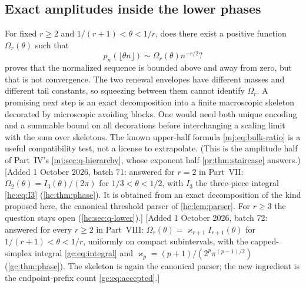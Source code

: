 \documentclass[11pt,a4paper]{article}
\theoremstyle{definition}\newaliascnt{definition}{theorem}
\theoremstyle{remark}\newaliascnt{remark}{theorem}
\begin{document}
\subsection{Exact amplitudes inside the lower phases}
\label{pr:sec:q-amplitudes}
For fixed $r\ge2$ and $1/(r+1)<\theta<1/r$, does there exist a positive
function $\Omega_r(\theta)$ such that
\begin{equation}
 p_n(\lfloor\theta n\rfloor)\sim\Omega_r(\theta)n^{-r/2}?
 \label{pr:eq:amplitudequestion}
\end{equation}
 proves that the normalized sequence is bounded above
and away from zero, but that is not convergence. The two renewal envelopes
have different masses and different tail constants, so squeezing between
them cannot identify $\Omega_r$. A promising next step is an exact
decomposition into a finite macroscopic skeleton decorated by microscopic
avoiding blocks. One would need both unique encoding and a summable bound on
all decorations before interchanging a scaling limit with the sum over
skeletons. The known upper-half formula \eqref{mj:eq:bulk-ratio} is a useful
compatibility test, not a license to extrapolate. (This is the amplitude
half of Part~IV's \cref{mj:sec:q-hierarchy}, whose exponent half
\cref{pr:thm:staircase} answers.)
[Added 1 October 2026, batch 71: answered for $r=2$ in Part~VII:
$\Omega_2(\theta)=I_3(\theta)/(2\pi)$ for $1/3<\theta<1/2$, with $I_3$ the
three-piece integral \eqref{hc:eq:I3} (\cref{hc:thm:phase}). It is obtained
from an exact decomposition of the kind proposed here, the canonical
threshold parser of \cref{hc:lem:parser}. For $r\ge3$ the question stays
open (\cref{hc:sec:q-lower}).]
[Added 1 October 2026, batch 72: answered for every $r\ge2$ in Part~VIII:
$\Omega_r(\theta)=\varkappa_{r+1}I_{r+1}(\theta)$ for $1/(r+1)<\theta<1/r$,
uniformly on compact subintervals, with the capped-simplex integral
\eqref{gc:eq:integral} and $\varkappa_p=(p+1)/(2^p\pi^{(p-1)/2})$
(\cref{gc:thm:phase}). The skeleton is again the canonical parser; the new
ingredient is the endpoint-prefix count \eqref{gc:eq:accepted}.]
\end{document}
